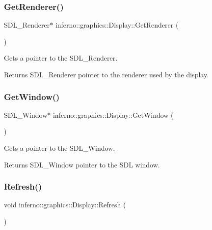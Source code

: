 \subsubsection{\texorpdfstring{Get\+Renderer()}{GetRenderer()}}
{\footnotesize\ttfamily S\+D\+L\+\_\+\+Renderer$\ast$ inferno\+::graphics\+::\+Display\+::\+Get\+Renderer (\begin{DoxyParamCaption}{ }\end{DoxyParamCaption})\hspace{0.3cm}{\ttfamily [inline]}}



Gets a pointer to the S\+D\+L\+\_\+\+Renderer. 

\begin{DoxyReturn}{Returns}
S\+D\+L\+\_\+\+Renderer pointer to the renderer used by the display. 
\end{DoxyReturn}
\mbox{\label{classinferno_1_1graphics_1_1_display_ae3eda38c23eae8e2d49bfab0ef3e2f6c}} 
\subsubsection{\texorpdfstring{Get\+Window()}{GetWindow()}}
{\footnotesize\ttfamily S\+D\+L\+\_\+\+Window$\ast$ inferno\+::graphics\+::\+Display\+::\+Get\+Window (\begin{DoxyParamCaption}{ }\end{DoxyParamCaption})\hspace{0.3cm}{\ttfamily [inline]}}



Gets a pointer to the S\+D\+L\+\_\+\+Window. 

\begin{DoxyReturn}{Returns}
S\+D\+L\+\_\+\+Window pointer to the S\+DL window. 
\end{DoxyReturn}
\mbox{\label{classinferno_1_1graphics_1_1_display_abb61ee638514984ecf3fb94e1fcdddec}} 
\subsubsection{\texorpdfstring{Refresh()}{Refresh()}}
{\footnotesize\ttfamily void inferno\+::graphics\+::\+Display\+::\+Refresh (\begin{DoxyParamCaption}{ }\end{DoxyParamCaption})\hspace{0.3cm}{\ttfamily [inline]}}



